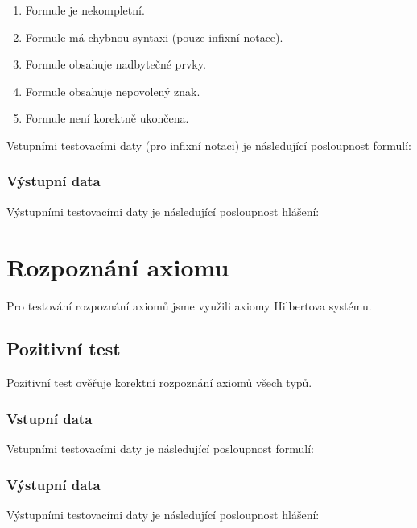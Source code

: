 \documentclass[thesis=B,czech,hidelinks]{thesis}[2012/06/26]
\begin{document}
\begin{enumerate}
	\item Formule je nekompletní.
	\item Formule má chybnou syntaxi (pouze infixní notace).
	\item Formule obsahuje nadbytečné prvky.
	\item Formule obsahuje nepovolený znak.
	\item Formule není korektně ukončena.
\end{enumerate}

Vstupními testovacími daty (pro infixní notaci) je následující posloupnost formulí:



\subsubsection{Výstupní data}

Výstupními testovacími daty je následující posloupnost hlášení:



\section{Rozpoznání axiomu}

Pro testování rozpoznání axiomů jsme využili axiomy Hilbertova systému.

\subsection{Pozitivní test}

Pozitivní test ověřuje korektní rozpoznání axiomů všech typů.

\subsubsection{Vstupní data}

Vstupními testovacími daty je následující posloupnost formulí:



\subsubsection{Výstupní data}

Výstupními testovacími daty je následující posloupnost hlášení:
\end{document}
